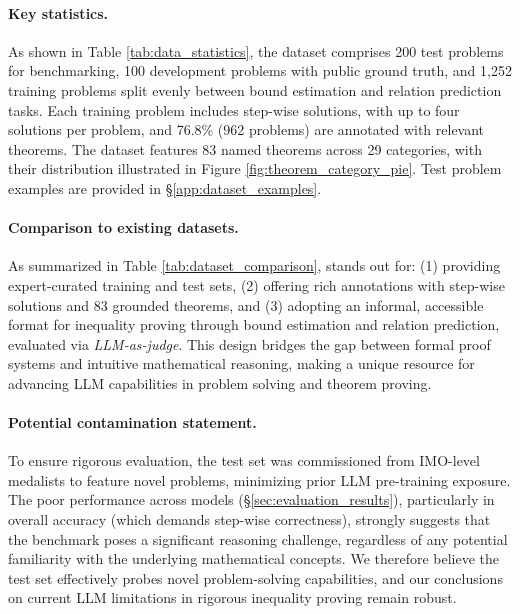 \paragraph{Key statistics.} As shown in Table \ref{tab:data_statistics}, the \dataset dataset comprises 200 test problems for benchmarking, 100 development problems with public ground truth, and 1,252 training problems split evenly between bound estimation and relation prediction tasks. Each training problem includes step-wise solutions, with up to four solutions per problem, and 76.8\% (962 problems) are annotated with relevant theorems. The dataset features 83 named theorems across 29 categories, with their distribution illustrated in Figure \ref{fig:theorem_category_pie}. Test problem examples are provided in \S\ref{app:dataset_examples}.



\paragraph{Comparison to existing datasets.} 
As summarized in Table \ref{tab:dataset_comparison}, \dataset stands out for: (1) providing expert-curated training and test sets, (2) offering rich annotations with step-wise solutions and 83 grounded theorems, and (3) adopting an informal, accessible format for inequality proving through bound estimation and relation prediction, evaluated via \textit{LLM-as-judge}. This design bridges the gap between formal proof systems and intuitive mathematical reasoning, making \dataset a unique resource for advancing LLM capabilities in problem solving and theorem proving.



\vspace{-2mm}
\paragraph{Potential contamination statement.}
To ensure rigorous evaluation, the \dataset test set was commissioned from IMO-level medalists to feature novel problems, minimizing prior LLM pre-training exposure. The poor performance across models (\S\ref{sec:evaluation_results}), particularly in overall accuracy (which demands step-wise correctness), strongly suggests that the benchmark poses a significant reasoning challenge, regardless of any potential familiarity with the underlying mathematical concepts. We therefore believe the \dataset test set effectively probes novel problem-solving capabilities, and our conclusions on current LLM limitations in rigorous inequality proving remain robust.

